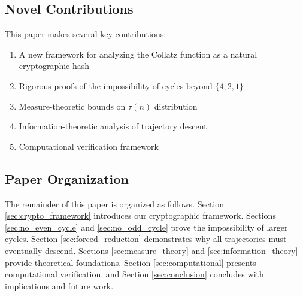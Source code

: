 \subsection{Novel Contributions}
This paper makes several key contributions:
\begin{enumerate}
\item A new framework for analyzing the Collatz function as a natural cryptographic hash
\item Rigorous proofs of the impossibility of cycles beyond $\{4,2,1\}$
\item Measure-theoretic bounds on $\tau(n)$ distribution
\item Information-theoretic analysis of trajectory descent
\item Computational verification framework
\end{enumerate}

\subsection{Paper Organization}
The remainder of this paper is organized as follows. Section \ref{sec:crypto_framework} introduces our cryptographic framework. Sections \ref{sec:no_even_cycle} and \ref{sec:no_odd_cycle} prove the impossibility of larger cycles. Section \ref{sec:forced_reduction} demonstrates why all trajectories must eventually descend. Sections \ref{sec:measure_theory} and \ref{sec:information_theory} provide theoretical foundations. Section \ref{sec:computational} presents computational verification, and Section \ref{sec:conclusion} concludes with implications and future work. 